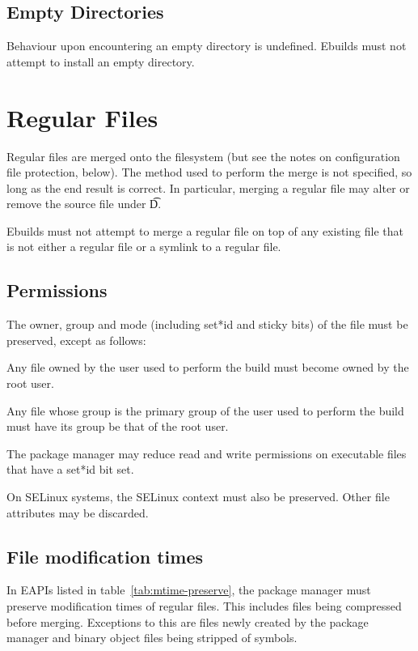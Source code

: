 \subsection{Empty Directories}

Behaviour upon encountering an empty directory is undefined. Ebuilds must not attempt to install an
empty directory.

\section{Regular Files}

Regular files are merged onto the filesystem (but see the notes on configuration file protection,
below). The method used to perform the merge is not specified, so long as the end result is correct.
In particular, merging a regular file may alter or remove the source file under \t{D}.

Ebuilds must not attempt to merge a regular file on top of any existing file that is not either a
regular file or a symlink to a regular file.

\subsection{Permissions}

The owner, group and mode (including set*id and sticky bits) of the file must be preserved, except
as follows:

\begin{compactitem}
\item Any file owned by the user used to perform the build must become owned by the root user.
\item Any file whose group is the primary group of the user used to perform the build must have
    its group be that of the root user.
\item The package manager may reduce read and write permissions on executable files that have a
    set*id bit set.
\end{compactitem}

On SELinux systems, the SELinux context must also be preserved. Other
file attributes may be discarded.

\subsection{File modification times}

In EAPIs listed in table~\ref{tab:mtime-preserve}, the package manager
must preserve modification times of regular files. This includes files
being compressed before merging. Exceptions to this are files newly
created by the package manager and binary object files being stripped
of symbols.

